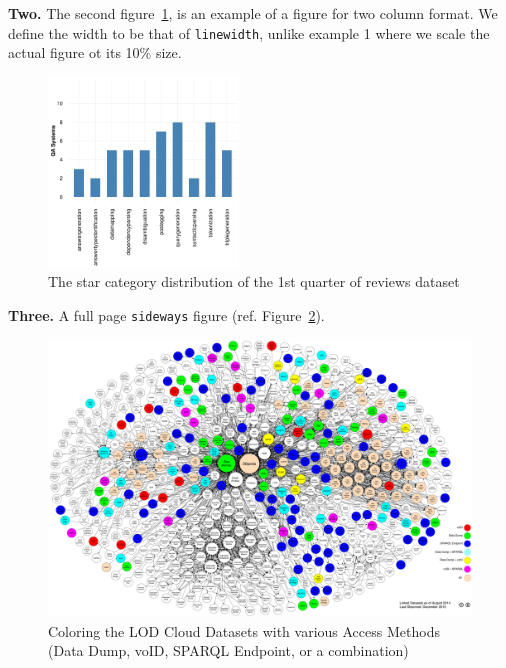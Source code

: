 \documentclass{sig-alternate-05-2015}
\begin{document}
\textbf{Two.} The second figure~\ref{plot2}, is an example of a figure for two column format. We define the width to be that of \texttt{linewidth}, unlike example 1 where we scale the actual figure ot its 10\% size.
\begin{figure}
\includegraphics[width=0.45\textwidth]{figures/plot2}
\caption{The star category distribution of the 1st quarter of reviews dataset}
\label{plot2}
\end{figure}


\textbf{Three.} A full page \texttt{sideways} figure (ref. Figure~\ref{fig:metadataAccessibility}).
\begin{figure}
 \centering
 \includegraphics[width=\textwidth]{figures/lod-cloud-metadata-accessibility.pdf}
  \caption{Coloring the LOD Cloud Datasets with various Access Methods (Data Dump, voID, SPARQL Endpoint, or a combination)}
  \label{fig:metadataAccessibility}
\end{figure}

\end{document}
